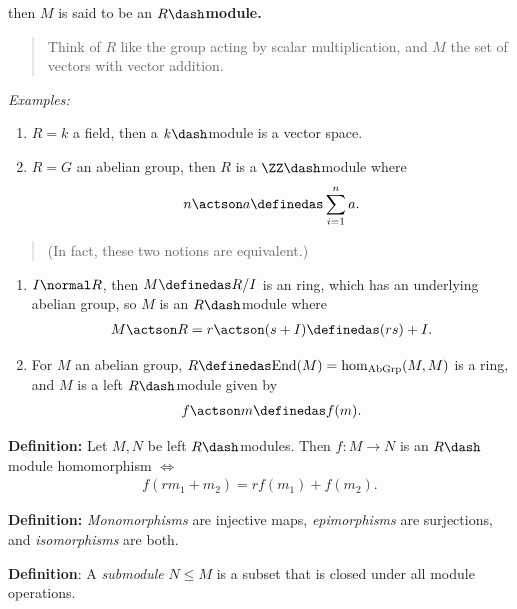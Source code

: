 then \(M\) is said to be an \textbf{\(R\dash\)module.}

\begin{quote}
Think of \(R\) like the group acting by scalar multiplication, and \(M\)
the set of vectors with vector addition.
\end{quote}

\emph{Examples:}

\begin{enumerate}
\def\labelenumi{\arabic{enumi}.}
\item
  \(R = k\) a field, then a \(k\dash\)module is a vector space.
\item
  \(R = G\) an abelian group, then \(R\) is a \(\ZZ\dash\)module where
  \begin{align*}
  n\actson a \definedas \sum_{i=1}^n a
  .\end{align*}
\end{enumerate}

\begin{quote}
(In fact, these two notions are equivalent.)
\end{quote}

\begin{enumerate}
\def\labelenumi{\arabic{enumi}.}
\setcounter{enumi}{2}
\item
  \(I \normal R\), then \(M \definedas R/I\) is an ring, which has an
  underlying abelian group, so \(M\) is an \(R\dash\)module where
  \begin{align*}
  M\actson R = r\actson(s+I) \definedas (rs) + I
  .\end{align*}
\item
  For \(M\) an abelian group,
  \(R \definedas \mathrm{End}(M) = \hom_{\text{AbGrp}}(M, M)\) is a
  ring, and \(M\) is a left \(R\dash\)module given by
  \begin{align*}
  f\actson m \definedas f(m)
  .\end{align*}
\end{enumerate}

\textbf{Definition:} Let \(M, N\) be left \(R\dash\)modules. Then
\(f: M \to N\) is an \(R\dash\)module homomorphism \(\iff\)
\begin{align*}
f(rm_1 + m_2) = rf(m_1) + f(m_2)
.\end{align*}

\textbf{Definition:} \emph{Monomorphisms} are injective maps,
\emph{epimorphisms} are surjections, and \emph{isomorphisms} are both.

\textbf{Definition}: A \emph{submodule} \(N\leq M\) is a subset that is
closed under all module operations.

